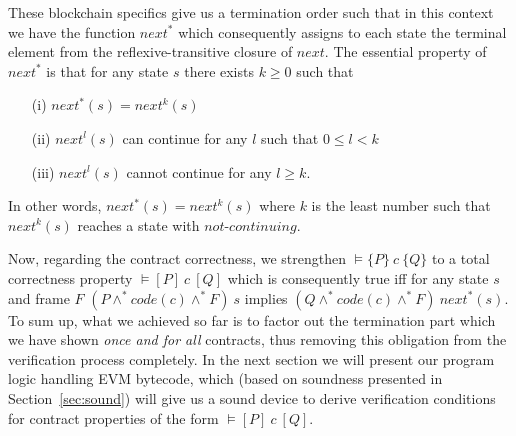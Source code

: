 \documentclass[sigplan,10pt,review]{acmart}\settopmatter{printfolios=true,printccs=false,printacmref=false}
\newcommand{\sconj}{\wedge^*}
\newcommand{\pvalid}[3]{\models\{#1\}\:#2\:\{#3\}}
\newcommand{\tvalid}[3]{\models[#1]\:#2\:[#3]}
\newcommand{\xnext}{\mathit{next}}
\newcommand{\code}[1]{\mathit{code}(#1)}
\newcommand{\ncont}{\mathit{not\mbox{-}continuing}}
\begin{document}
These blockchain specifics give us a termination order such that in this context we have the function $\xnext^*$ which 
consequently assigns to each state the terminal element from the reflexive-transitive closure of $\xnext$. 
The essential property of $\xnext^*$ is that for any state $s$ there exists $k \geq 0$ such that
\begin{itemize}
\item[(i)] $\xnext^*(s) = \xnext^k(s)$
\item[(ii)] $\xnext^l(s)$ can continue for any $l$ such that $0 \le l < k$
\item[(iii)] $\xnext^l(s)$ cannot continue for any $l \ge k$.
\end{itemize}
In other words, $\xnext^*(s) = \xnext^k(s)$ where $k$ is the least number such that
$\xnext^k(s)$ reaches a state with $\ncont$. 

Now, regarding the contract correctness, we strengthen $\pvalid{P}{c}{Q}$ to 
a total correctness property $\tvalid{P}{c}{Q}$ which is consequently true iff
for any state $s$ and frame $F$ 
$(P \sconj \code{c} \sconj F)\: s$ implies $(Q \sconj \code{c} \sconj F)\: \xnext^*(s)$. 
To sum up, what we achieved so far is to factor out the termination part which we have 
shown \emph{once and for all} contracts, thus removing this obligation from the verification
process completely. In the next section we will present our program logic handling EVM bytecode, 
which (based on soundness presented in Section~\ref{sec:sound}) will give us 
a sound device to derive verification conditions for contract properties of the form $\tvalid{P}{c}{Q}$.   
%       
\end{document}
